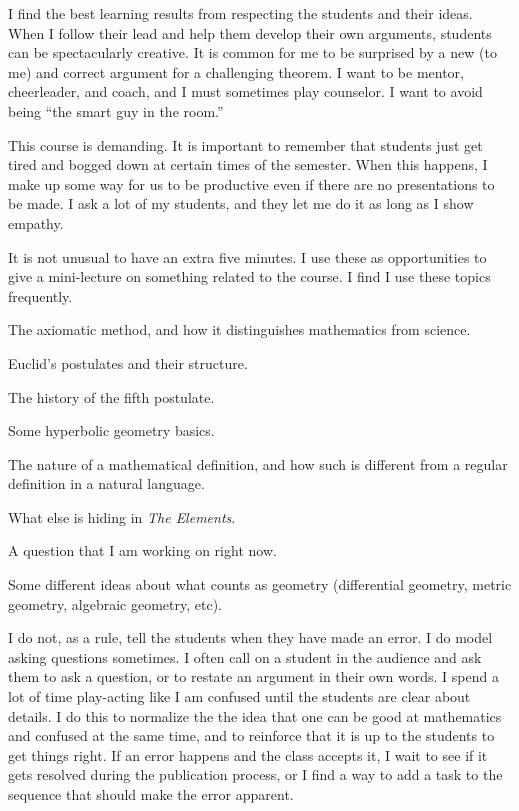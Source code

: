 \documentclass{tufte-handout}
\theoremstyle{definition}
\begin{document}
I find the best learning results from respecting the students and their ideas. When I follow their lead and help them develop their own arguments, students can be spectacularly creative. It is common for me to be surprised by a new (to me)  and correct argument for a challenging theorem. I want to be mentor, cheerleader, and coach, and I must sometimes play counselor. I want to avoid being ``the smart guy in the room.''

This course is demanding. It is important to remember that students just get tired and bogged down at certain times of the semester. When this happens, I make up some way for us to be productive even if there are no presentations to be made. I ask a lot of my students, and they let me do it as long as I show empathy.

It is not unusual to have an extra five minutes. I use these as opportunities to give a mini-lecture on something related to the course. I find I use these topics frequently.
\begin{compactitem}
\item The axiomatic method, and how it distinguishes mathematics from science.
\item Euclid's postulates and their structure.
\item The history of the fifth postulate.
\item Some hyperbolic geometry basics.
\item The nature of a mathematical definition, and how such is different from a regular definition in a natural language.
\item What else is hiding in \emph{The Elements}.
\item A question that I am working on right now.
\item Some different ideas about what counts as geometry (differential geometry, metric geometry, algebraic geometry, etc).
\end{compactitem}

I do not, as a rule, tell the students when they have made an error. I do model asking questions sometimes. I often call on a student in the audience and ask them to ask a question, or to restate an argument in their own words. I spend a lot of time play-acting like I am confused until the students are clear about details. I do this to normalize the the idea that one can be good at mathematics and confused at the same time, and to reinforce that it is up to the students to get things right. If an error happens and the class accepts it, I wait to see if it gets resolved during the publication process, or I find a way to add a task to the sequence that should make the error apparent. 
\end{document}
